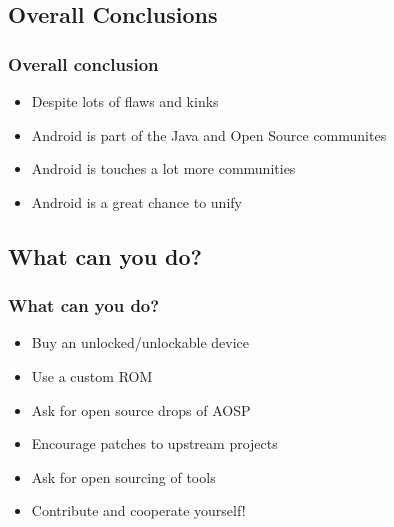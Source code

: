 \documentclass{beamer}
\begin{document}
  \subsection{Overall Conclusions}
    \begin{frame}
      \frametitle {Overall conclusion}
      \begin{itemize}
        \item<1-> Despite lots of flaws and kinks
        \item<2-> Android is part of the Java and Open Source communites
        \item<3-> Android is touches a lot more communities 
        \item<4-> Android is a great chance to unify 
      \end{itemize}
    \end{frame}

  \subsection{What can you do?}
    \begin{frame}
      \frametitle{What can you do?}
      \begin{itemize}
        \item<1-> Buy an unlocked/unlockable device
        \item<2-> Use a custom ROM
        \item<3-> Ask for open source drops of AOSP 
        \item<4-> Encourage patches to upstream projects
        \item<5-> Ask for open sourcing of tools
        \item<6-> Contribute and cooperate yourself! 
      \end{itemize}
    \end{frame}
\end{document}
